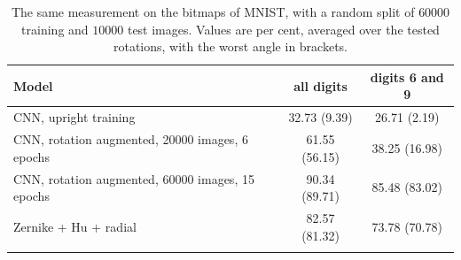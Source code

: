 \begin{table}[t]
\caption{The same measurement on the bitmaps of MNIST, with a random split of
$60000$ training and $10000$ test images. Values are per cent, averaged over the
tested rotations, with the worst angle in brackets.}
\label{tab:mnist}
\begin{tabular}{lcc}
\toprule
Model & all digits & digits 6 and 9\\
\midrule
CNN, upright training & 32.73 (9.39) & 26.71 (2.19)\\
CNN, rotation augmented, 20000 images, 6 epochs & 61.55 (56.15) & 38.25 (16.98)\\
CNN, rotation augmented, 60000 images, 15 epochs & 90.34 (89.71) & 85.48 (83.02)\\
Zernike + Hu + radial & 82.57 (81.32) & 73.78 (70.78)\\
\botrule
\end{tabular}
\end{table}
